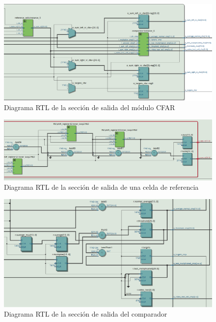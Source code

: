 \begin{figure}
\centering
\includegraphics[scale=0.5]{./Figures/RTL_cfar_2.png}
\caption{Diagrama RTL de la sección de salida del módulo CFAR}
\label{fig:RTL_cfar_2}
\end{figure}



\begin{figure}
\centering
\includegraphics[scale=0.6, angle=270]{./Figures/RTL_cfar_rc_1.png}
\caption{Diagrama RTL de la sección de salida de una celda de referencia}
\label{fig:RTL_cfar_rc_1}
\end{figure}



\begin{figure}
\centering
\includegraphics[scale=0.6, angle=270]{./Figures/RTL_cfar_comparador_1.png}
\caption{Diagrama RTL de la sección de salida del comparador}
\label{fig:RTL_cfar_comparador_1}
\end{figure}






